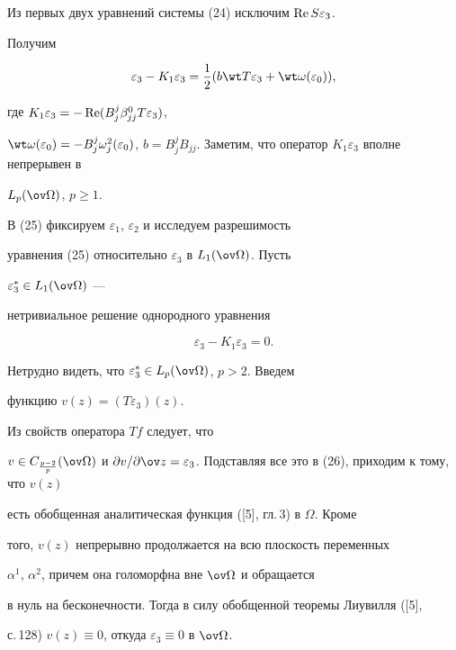 Из первых двух уравнений системы (24) исключим $\operatorname{Re} S \varepsilon_3$. 


Получим 


\begin{equation} 


\varepsilon_3-K_1\varepsilon_3=\frac{1}{2}(b\wt T \varepsilon_3+ 


\wt\omega(\varepsilon_0)), 


\end{equation} 


где $K_1\varepsilon_3=-\operatorname{Re}(B^j_j \beta^0_{jj}T \varepsilon_3)$, 


$\wt\omega(\varepsilon_0)=-B^j_j \omega^2_j(\varepsilon_0)$, $b=B^j_j 


B_{jj}$. Заметим, что оператор $K_1\varepsilon_3$ вполне непрерывен в 


$L_p(\ov\Omega)$, $p\ge1$. 


В (25) фиксируем $\varepsilon_1$, $\varepsilon_2$ и исследуем разрешимость 


уравнения (25) относительно $\varepsilon_3$ в $L_1(\ov\Omega)$. Пусть 


$\varepsilon^*_3\in L_1(\ov\Omega)$ --- 


нетривиальное решение однородного уравнения 


\begin{equation} 


\varepsilon_3-K_1\varepsilon_3=0. 


\end{equation} 


Нетрудно видеть, что $\varepsilon^*_3\in L_p(\ov\Omega)$, $p>2$. Введем 


функцию $v(z)=(T\varepsilon_3)(z)$. 


Из свойств оператора $T f$ следует, что 


$v\in C_{\frac{p-2}{p}}(\ov\Omega)$ и $\partial v/\partial\ov 


z=\varepsilon_3$. Подставляя все это в (26), приходим к тому, что $v(z)$ 


есть обобщенная аналитическая функция ([5], гл.\,3) в $\Omega$. Кроме 


того, $v(z)$ непрерывно продолжается на всю плоскость переменных 


$\alpha^1$, $\alpha^2$, причем она голоморфна вне $\ov\Omega$ и обращается 


в нуль на бесконечности. Тогда в силу обобщенной теоремы Лиувилля ([5], 


с.\,128) $v(z)\equiv0$, откуда $\varepsilon_3\equiv0$ в $\ov\Omega$. 


